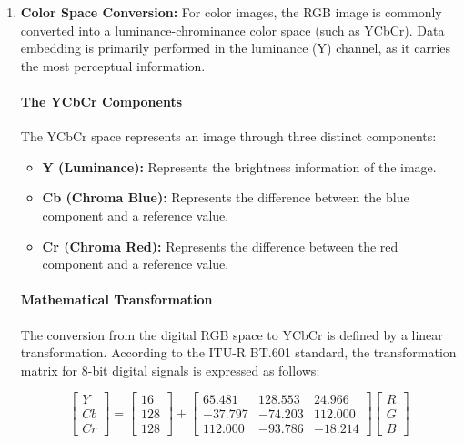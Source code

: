 \documentclass[12pt,a4paper,oneside]{report}
\begin{document}
	\begin{enumerate}
		\item \textbf{Color Space Conversion:}  
		For color images, the RGB image is commonly converted into a luminance-chrominance color space (such as YCbCr). Data embedding is primarily performed in the luminance (Y) channel, as it carries the most perceptual information.
		
		\paragraph{The YCbCr Components}
		The YCbCr space represents an image through three distinct components:
		\begin{itemize}
			\item \textbf{Y (Luminance):} Represents the brightness information    of the image.
			\item \textbf{Cb (Chroma Blue):} Represents the difference between the blue component and a reference value.
			\item \textbf{Cr (Chroma Red):} Represents the difference between the red component and a reference value.
		\end{itemize}
		
		\paragraph{Mathematical Transformation}
		The conversion from the digital RGB space to YCbCr is defined by a linear transformation. According to the ITU-R BT.601 standard, the transformation matrix for 8-bit digital signals is expressed as follows:
		
		\begin{equation}
			\begin{bmatrix} 
				Y \\ 
				Cb \\ 
				Cr 
			\end{bmatrix} = 
			\begin{bmatrix} 
				16 \\ 
				128 \\ 
				128 
			\end{bmatrix} + 
			\begin{bmatrix} 
				65.481 & 128.553 & 24.966 \\ 
				-37.797 & -74.203 & 112.000 \\ 
				112.000 & -93.786 & -18.214 
			\end{bmatrix} 
			\begin{bmatrix} 
				R \\ 
				G \\ 
				B 
			\end{bmatrix}
		\end{equation}
		

\end{enumerate}
\end{document}
